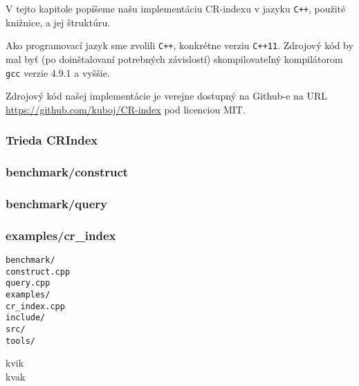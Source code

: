 
V tejto kapitole popíšeme našu implementáciu CR-indexu v jazyku \texttt{C++}, použité knižnice, a jej štruktúru.

Ako programovací jazyk sme zvolili \texttt{C++}, konkrétne verziu \texttt{C++11}. Zdrojový kód by mal byť (po doinštalovaní potrebných závislostí) skompilovateľný kompilátorom \texttt{gcc} verzie 4.9.1 a vyššie.

Zdrojový kód našej implementácie je verejne dostupný na Github-e na URL \url{https://github.com/kuboj/CR-index} pod licenciou MIT.

\subsubsection{Trieda CRIndex}

\subsubsection{benchmark/construct}

\subsubsection{benchmark/query}

\subsubsection{examples/cr\_index}

\begin{minipage}[t]{0.3\linewidth}
    \vspace{0pt}
    \texttt{benchmark/} \\
    \hspace*{2em}\texttt{construct.cpp} \\
    \hspace*{2em}\texttt{query.cpp} \\
    \texttt{examples/}  \\
    \hspace*{2em}\texttt{cr\_index.cpp} \\
    \texttt{include/}   \\
    \texttt{src/}       \\
    \texttt{tools/}     \\
\end{minipage}
\hspace{0.5cm}
\begin{minipage}[t]{0.65\linewidth}
    \vspace{0pt}
    kvik \\
    kvak
\end{minipage}
